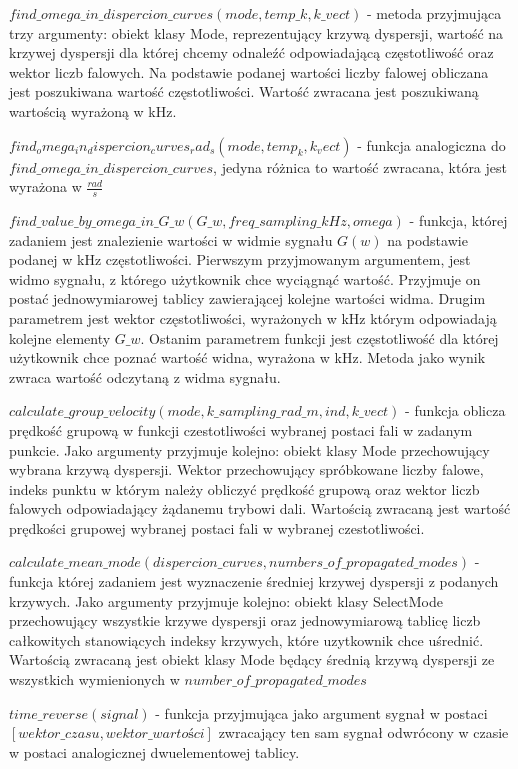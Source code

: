 $find\_omega\_in\_dispercion\_curves(mode, temp\_k, k\_vect)$ - metoda przyjmująca trzy argumenty: obiekt klasy Mode, reprezentujący krzywą dyspersji, wartość na krzywej dyspersji dla której chcemy odnaleźć odpowiadającą częstotliwość oraz wektor liczb falowych. Na podstawie podanej wartości liczby falowej obliczana jest poszukiwana wartość częstotliwości. Wartość zwracana jest poszukiwaną wartością wyrażoną w kHz.

$find_omega_in_dispercion_curves_rad_s(mode, temp_k, k_vect)$ - funkcja analogiczna do $find\_omega\_in\_dispercion\_curves$, jedyna różnica to wartość zwracana, która jest wyrażona w $\frac{rad}{s}$

$find\_value\_by\_omega\_in\_G\_w(G\_w, freq\_sampling\_kHz, omega)$ - funkcja, której zadaniem jest znalezienie wartości w widmie sygnału $G(w)$ na podstawie podanej w kHz częstotliwości. Pierwszym przyjmowanym argumentem, jest widmo sygnału, z którego użytkownik chce wyciągnąć wartość. Przyjmuje on postać jednowymiarowej tablicy zawierającej kolejne wartości widma. Drugim parametrem jest wektor częstotliwości, wyrażonych w kHz którym odpowiadają kolejne elementy $G\_w$. Ostanim parametrem funkcji jest częstotliwość dla której użytkownik chce poznać wartość widna, wyrażona w kHz. Metoda jako wynik zwraca wartość odczytaną z widma sygnału. 

$calculate\_group\_velocity(mode, k\_sampling\_rad\_m, ind, k\_vect)$ - funkcja oblicza prędkość grupową w funkcji czestotliwości wybranej postaci fali w zadanym punkcie. Jako argumenty przyjmuje kolejno: obiekt klasy Mode przechowujący wybrana krzywą dyspersji. Wektor przechowujący spróbkowane liczby falowe, indeks punktu w którym należy obliczyć prędkość grupową oraz wektor liczb falowych odpowiadający żądanemu trybowi dali. Wartością zwracaną jest wartość prędkości grupowej wybranej postaci fali w wybranej czestotliwości.

$calculate\_mean\_mode(dispercion\_curves, numbers\_of\_propagated\_modes)$ - funkcja której zadaniem jest wyznaczenie średniej krzywej dyspersji z podanych krzywych. Jako argumenty przyjmuje kolejno: obiekt klasy SelectMode przechowujący wszystkie krzywe dyspersji oraz jednowymiarową tablicę liczb całkowitych stanowiących indeksy krzywych, które uzytkownik chce uśrednić. Wartością zwracaną jest obiekt klasy Mode będący średnią krzywą dyspersji ze wszystkich wymienionych w $number\_of\_propagated\_modes$

$time\_reverse(signal)$ - funkcja przyjmująca jako argument sygnał w postaci $[wektor\_czasu, wektor\_wartości]$ zwracający ten sam sygnał odwrócony w czasie w postaci analogicznej dwuelementowej tablicy.

